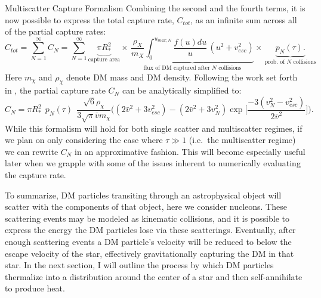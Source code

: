 \documentclass[a4paper,11pt]{article}
\begin{document}
\begin{section}{Multiscatter Capture Formalism}
    Combining the second and the fourth terms, it is now possible to express the total capture rate, $C_{tot}$, as an infinite sum across all of the partial capture rates:
    \begin{equation}
    C_{tot} = \sum_{N=1}^{\infty} C_{N} = \sum_{N=1}^{\infty} \underbrace{\pi R_*^2}_\textrm{capture area}\times \,\underbrace{\frac{\rho_X}{m_X} \int_0^{u_{max;N}} \dfrac{f(u)du}{u}\,(u^2+v_{ esc}^2)}_\textrm{flux of DM captured after $N$ collisions}\times \, \underbrace{p_{ N}(\tau).}_\textrm{prob. of $N$ collisions}
    \end{equation}
    Here $m_\chi$ and $\rho_\chi$ denote DM mass and DM density. 
    Following the work set forth in \cite{Bramante:2017}, the partial capture rate $C_N$ can be analytically simplified to:
    \begin{equation}
        C_N = \pi R_{*}^2 ~~ p_N(\tau)~~ \frac{\sqrt{6}\rho_{\chi}}{3\sqrt{\pi}\bar{v}m_{\chi}}\Bigg((2\bar{v}^2 + 3v_{esc}^2) - (2\bar{v}^2 + 3v_{N}^2) \exp\Big[\frac{-3(v_N^2 - v_{esc}^2)}{2\bar{v}^2} \Big]    \Bigg). 
        \label{eq22}
    \end{equation}
    While this formalism will hold for both single scatter and multiscatter regimes, if we plan on only considering the case where $\tau \gg 1$ (i.e.~the multiscatter regime) we can rewrite $C_N$ in an approximative fashion.
    This will become especially useful later when we grapple with some of the issues inherent to numerically evaluating the capture rate.

    To summarize, DM particles transiting through an astrophysical object will scatter with the components of that object, here we consider nucleons.
    These scattering events may be modeled as kinematic collisions, and it is possible to express the energy the DM particles lose via these scatterings.
    Eventually, after enough scattering events a DM particle's velocity will be reduced to below the escape velocity of the star, effectively gravitationally capturing the DM in that star.
    In the next section, I will outline the process by which DM particles thermalize into a distribution around the center of a star and then self-annihilate to produce heat.
\end{section}
\end{document}
